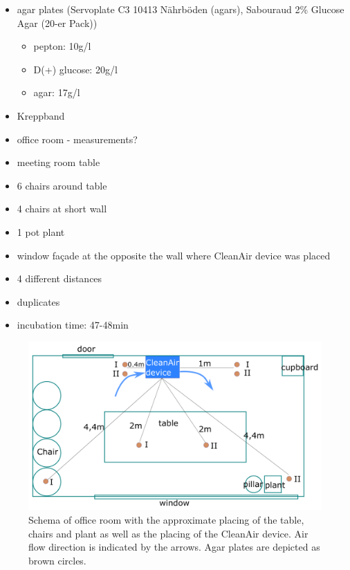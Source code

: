 \documentclass[hyperref]{labbook}
\begin{document}
\begin{itemize}
\item agar plates (Servoplate C3 10413 Nährböden (agars), Sabouraud 2\% Glucose Agar (20-er Pack))
\begin{itemize}
\item pepton: 10g/l
\item D(+) glucose: 20g/l
\item agar: 17g/l
\end{itemize}
\item Kreppband
\end{itemize}
\begin{itemize}
\item office room - measurements?
\item meeting room table 
\item 6 chairs around table
\item 4 chairs at short wall
\item 1 pot plant
\item window façade at the opposite the wall where CleanAir device was placed
\end{itemize}
\begin{itemize}
\item 4 different distances
\item duplicates
\item incubation time: 47-48min
\end{itemize}
\begin{figure}[H]
\includegraphics[scale=0.28]{cleanair_experiment_schema}
\caption{Schema of office room with the approximate placing of the table, chairs and plant as well as the placing of the CleanAir device. Air flow direction is indicated by the arrows. Agar plates are depicted as brown circles.}
\end{figure}
\end{document}

